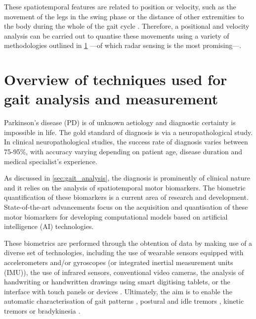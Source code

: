 	These spatiotemporal features are related to position or velocity, such as the movement of the legs in the swing phase or the distance of other extremities to the body during the whole of the gait cycle \cite{Biase2020}. Therefore, a positional and velocity analysis can be carried out to quantise these movements using a variety of methodologies outlined in \cref{sec:gait_methods} ---of which radar sensing is the most promising---.
	
	\section{Overview of techniques used for gait analysis and measurement} \label{sec:gait_methods}
	
	Parkinson's disease (PD) is of unknown aetiology and diagnostic certainty is impossible in life. The gold standard of diagnosis is via a neuropathological study. In clinical neuropathological studies, the success rate of diagnosis varies between 75-95\%, with accuracy varying depending on patient age, disease duration and medical specialist's experience.
	
	As discussed in \cref{sec:gait_analysis}, the diagnosis is prominently of clinical nature and it relies on the analysis of spatiotemporal motor biomarkers. The biometric quantification of these biomarkers is a current area of research and development. State-of-the-art advancements focus on the acquisition and quantisation of these motor biomarkers for developing computational models based on artificial intelligence (AI) technologies.
	
	These biometrics are performed through the obtention of data by making use of a diverse set of technologies, including the use of wearable sensors equipped with accelerometers and/or gyroscopes (or integrated inertial measurement units (IMU)), the use of infrared sensors, conventional video cameras, the analysis of handwriting or handwritten drawings using smart digitising tablets, or the interface with touch panels or devices \cite{Biase2020,Zanardi2021}. Ultimately, the aim is to enable the automatic characterisation of gait patterns \cite{Biase2020,Perumal2016}, postural and idle tremors \cite{Delrobaei2018}, kinetic tremors \cite{Rosenblum2013} or bradykinesia \cite{Mitsi2017}.
	
